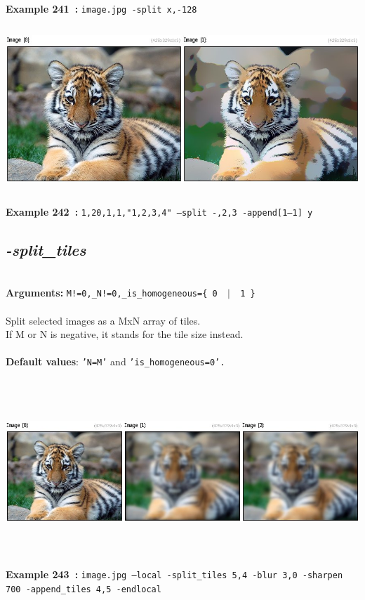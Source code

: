 \documentclass[a4paper,11pt,twoside]{book}
\begin{document}
\begin{center}
{\footnotesize \textbf{Example 241~:} \texttt{image.jpg -split x,-128}}
\\\includegraphics[keepaspectratio=true,height=7cm,width=\textwidth]{img/gmic_def242.jpg}\\
{\footnotesize \textbf{Example 242~:} \texttt{1,20,1,1,"1,2,3,4" --split -,2,3 -append[1--1] y}}
\end{center}

\subsection{\emph{-split\_tiles} }\vspace*{-0.5em}
~\\\textbf{Arguments: } 
{\small \texttt{M!=0,\_N!=0,\_is\_homogeneous=\{ 0 ~$|$~ 1 \}}}\\~\\
Split selected images as a MxN array of tiles.
~\\If M or N is negative, it stands for the tile size instead.
~\\~\\\textbf{Default values}: {\small \texttt{'N=M'} and \texttt{'is\_homogeneous=0'.}}
\begin{center}\includegraphics[keepaspectratio=true,height=7cm,width=\textwidth]{img/gmic_def243.jpg}\\
{\footnotesize \textbf{Example 243~:} \texttt{image.jpg --local -split\_tiles 5,4 -blur 3,0 -sharpen 700 -append\_tiles 4,5 -endlocal}}
\end{center}
\end{document}
